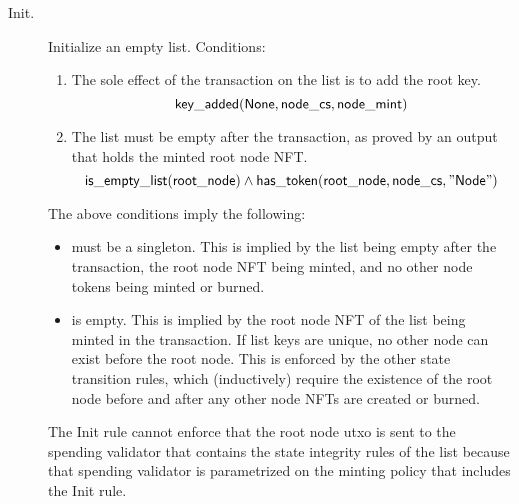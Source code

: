 \documentclass[../midgard.tex]{subfiles}
\begin{document}
\newcommand{\initSpendingValidatorWarning}[0]{
    \begin{warningblock}
        Offchain code for the list-initialization transaction MUST send the root node to the list's spending validator. Otherwise, the linked list can be corrupted.
    \end{warningblock}
}

\begin{description}
    \item[Init.] Initialize an empty list. Conditions:
        \begin{enumerate}
            \item The sole effect of the transaction on the list is to add the root key.
                \begin{equation*}
                    \mathsf{key\_added}(\mathsf{None}, \mathsf{node\_cs}, \mathsf{node\_mint})
                \end{equation*}
            
            \item The list must be empty after the transaction, as proved by an output  that holds the minted root node NFT.
                \begin{equation*}
                    \mathsf{is\_empty\_list}(\mathsf{root\_node})  \land
                    \mathsf{has\_token}(\mathsf{root\_node}, \mathsf{node\_cs}, \mathsf{"Node"})
                \end{equation*}
        \end{enumerate}
        The above conditions imply the following:
        \begin{itemize}
            \item {} must be a singleton. This is implied by the list being empty after the transaction, the root node NFT being minted, and no other node tokens being minted or burned.
            \item {} is empty. This is implied by the root node NFT of the list being minted in the transaction. If list keys are unique, no other node can exist before the root node. This is enforced by the other state transition rules, which (inductively) require the existence of the root node before and after any other node NFTs are created or burned.
        \end{itemize}
        
        The Init rule cannot enforce that the root node utxo is sent to the spending validator that contains the state integrity rules of the list because that spending validator is parametrized on the minting policy that includes the Init rule.
        

\end{description}
\end{document}
